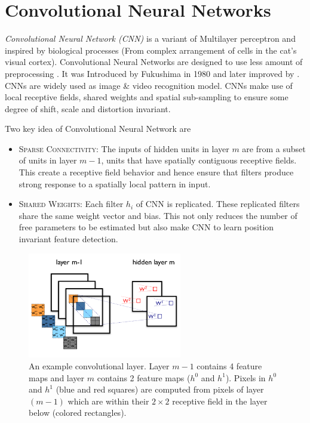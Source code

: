 \section{Convolutional Neural Networks}
\emph{Convolutional Neural Network (CNN)} is a variant of Multilayer perceptron  and inspired by biological processes (From complex arrangement of cells in the cat's visual cortex). Convolutional Neural Networks are designed to use less amount of preprocessing \cite{lecun1998gradient}. It was Introduced by Fukushima in 1980 and later  improved by \citet{lecun1998gradient}. CNNs are widely used as image \& video recognition model. CNNs make use of local receptive fields, shared weights and spatial sub-sampling to ensure some degree of shift, scale and distortion invariant.

\noindent Two key idea of Convolutional Neural Network are
\begin{itemize}
\item \textsc{Sparse Connectivity:} The inputs of hidden units in layer $m$ are from a subset of units in layer $m-1$, units that have spatially contiguous receptive fields. This create a receptive field behavior and hence ensure that filters produce strong response to a spatially local pattern in input.


\item \textsc{Shared Weights:} Each filter $h_i$ of CNN is replicated. These replicated filters share the same weight vector and bias. This not only reduces the number of free parameters to be estimated but also make CNN to learn position invariant feature detection.
\end{itemize}

\begin{figure}[!ht]
\centering
\includegraphics[width=0.6\textwidth]{./imgs/convolution.png} 
\caption[convolutional layer explained]{An example convolutional layer. Layer $m-1$ contains 4 feature maps and layer $m$ contains 2 feature maps ($h^0$ and $h^1$). Pixels in $h^0$ and $h^1$ (blue and red squares) are computed from pixels of layer $(m-1)$ which are within their $2\times2$ receptive field in the layer below (colored rectangles).}
\label{fig:cnn_layer}
\end{figure}


